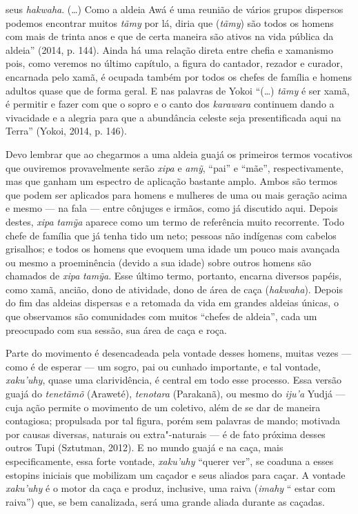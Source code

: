 seus \emph{hakwaha}. (\ldots{}) Como a aldeia Awá é uma reunião de vários
grupos dispersos podemos encontrar muitos \emph{tãmy} por lá, diria que
(\emph{tãmy}) são todos os homens com mais de trinta anos e que de certa
maneira são ativos na vida pública da aldeia'' (2014, p. 144). Ainda há
uma relação direta entre chefia e xamanismo pois, como veremos no último
capítulo, a figura do cantador, rezador e curador, encarnada pelo xamã,
é ocupada também por todos os chefes de família e homens adultos quase
que de forma geral. E nas palavras de Yokoi ``(\ldots{}) \emph{tãmy} é ser
xamã, é permitir e fazer com que o sopro e o canto dos \emph{karawara}
continuem dando a vivacidade e a alegria para que a abundância celeste
seja presentificada aqui na Terra'' (Yokoi, 2014, p. 146).

Devo lembrar que ao chegarmos a uma aldeia guajá os primeiros termos
vocativos que ouviremos provavelmente serão \emph{xipa} e \emph{amỹ},
``pai'' e ``mãe'', respectivamente, mas que ganham um espectro de
aplicação bastante amplo. Ambos são termos que podem ser aplicados para
homens e mulheres de uma ou mais geração acima e mesmo --- na fala --- entre
cônjuges e irmãos, como já discutido aqui. Depois destes, \emph{xipa}
\emph{tamỹa} aparece como um termo de referência muito recorrente. Todo chefe de família que já tenha tido um neto; pessoas não indígenas com cabelos grisalhos; e todos os homens que evoquem uma idade um pouco mais avançada ou mesmo a proeminência (devido a sua idade) sobre outros homens são chamados de \emph{xipa} \emph{tamỹa}. Esse último termo,
portanto, encarna diversos papéis, como xamã, ancião, dono de atividade,
dono de área de caça (\emph{hakwaha}). Depois do fim das aldeias
dispersas e a retomada da vida em grandes aldeias únicas, o que
observamos são comunidades com muitos ``chefes de aldeia'', cada um
preocupado com sua sessão, sua área de caça e roça.

Parte do movimento é desencadeada pela vontade desses homens, muitas
vezes --- como é de esperar --- um sogro, pai ou cunhado importante, e tal
vontade, \emph{xaku'uhy}, quase uma clarividência, é central em todo
esse processo. Essa versão guajá do \emph{tenetãmõ} (Araweté),
\emph{tenotara} (Parakanã), ou mesmo do \emph{iju'a} Yudjá --- cuja ação
permite o movimento de um coletivo, além de se dar de maneira
contagiosa; propulsada por tal figura, porém sem palavras de mando;
motivada por causas diversas, naturais ou extra"-naturais --- é de fato
próxima desses outros Tupi (Sztutman, 2012). E no mundo guajá e na caça,
mais especificamente, essa forte vontade, \emph{xaku'uhy} ``querer ver'',
se coaduna a esses estopins iniciais que mobilizam um caçador e seus
aliados para caçar. A vontade \emph{xaku'uhy} é o motor da caça e
produz, inclusive, uma raiva (\emph{imahy} `` estar com raiva'') que, se
bem canalizada, será uma grande aliada durante as caçadas.

